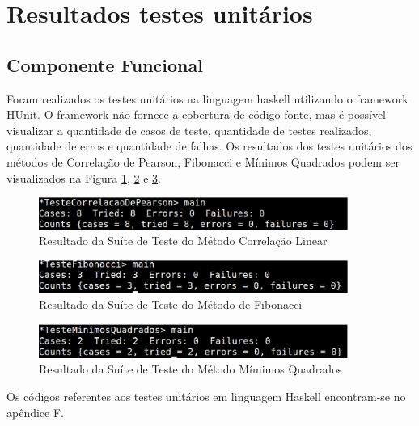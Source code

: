 \section{Resultados testes unitários}

\subsection{Componente Funcional}

Foram realizados os testes unitários na linguagem haskell utilizando o framework HUnit. O framework não fornece a cobertura de código fonte, mas é possível visualizar a quantidade de casos de teste, quantidade de testes realizados, quantidade de erros e quantidade de falhas. Os resultados dos testes unitários dos métodos de Correlação de Pearson, Fibonacci e Mínimos Quadrados podem ser visualizados na Figura \ref{testeCorrelacaoHaskell}, \ref{testeFibonacciHaskell} e \ref{TesteMinimosHaskell}.

\begin{figure}[H]
\centering
\includegraphics[width=0.9\textwidth]{figuras/testeCorrelacaoHaskell}
\caption{Resultado da Suíte de Teste do Método Correlação Linear}
\label{testeCorrelacaoHaskell}
\end{figure}

\begin{figure}[H]
\centering
\includegraphics[width=0.9\textwidth]{figuras/testeFibonacciHaskell}
\caption{Resultado da Suíte de Teste do Método de Fibonacci}
\label{testeFibonacciHaskell}
\end{figure}

\begin{figure}[H]
\centering
\includegraphics[width=0.9\textwidth]{figuras/TesteMinimosHaskell}
\caption{Resultado da Suíte de Teste do Método Mímimos Quadrados}
\label{TesteMinimosHaskell}
\end{figure}

Os códigos referentes aos testes unitários em linguagem Haskell encontram-se no apêndice F.

